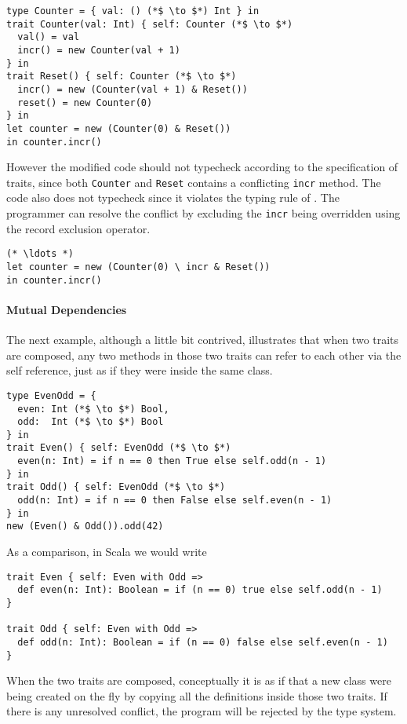 \begin{lstlisting}
type Counter = { val: () (*$ \to $*) Int } in
trait Counter(val: Int) { self: Counter (*$ \to $*)
  val() = val
  incr() = new Counter(val + 1)
} in
trait Reset() { self: Counter (*$ \to $*)
  incr() = new (Counter(val + 1) & Reset())
  reset() = new Counter(0)
} in
let counter = new (Counter(0) & Reset())
in counter.incr()
\end{lstlisting}

However the modified code should not typecheck according to the specification of
traits, since both \lstinline$Counter$ and \lstinline$Reset$ contains a
conflicting \lstinline$incr$ method. The code also does not typecheck since it
violates the typing rule of \name. The programmer can resolve the conflict by
excluding the \lstinline$incr$ being overridden using the record exclusion
operator.

\begin{lstlisting}
(* \ldots *)
let counter = new (Counter(0) \ incr & Reset())
in counter.incr()
\end{lstlisting}

\paragraph{Mutual Dependencies}
The next example, although a little bit contrived, illustrates that when two
traits are composed, any two methods in those two traits can refer to each
other via the self reference, just as if they were inside the same class.

\begin{lstlisting}
type EvenOdd = {
  even: Int (*$ \to $*) Bool,
  odd:  Int (*$ \to $*) Bool
} in
trait Even() { self: EvenOdd (*$ \to $*)
  even(n: Int) = if n == 0 then True else self.odd(n - 1)
} in
trait Odd() { self: EvenOdd (*$ \to $*)
  odd(n: Int) = if n == 0 then False else self.even(n - 1)
} in
new (Even() & Odd()).odd(42)
\end{lstlisting}

As a comparison, in Scala we would write

\begin{lstlisting}
trait Even { self: Even with Odd =>
  def even(n: Int): Boolean = if (n == 0) true else self.odd(n - 1)
}

trait Odd { self: Even with Odd =>
  def odd(n: Int): Boolean = if (n == 0) false else self.even(n - 1)
}
\end{lstlisting}

When the two traits are composed, conceptually it is as if that a new class were
being created on the fly by copying all the definitions inside those two traits.
If there is any unresolved conflict, the program will be rejected by the type
system.

